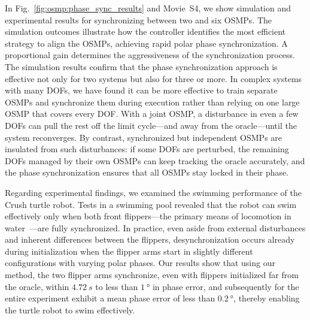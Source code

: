 In Fig.~\ref{fig:osmp:phase_sync_results} and Movie~S4, we show simulation and experimental results for synchronizing between two and six \glspl{OSMP}. The simulation outcomes illustrate how the controller identifies the most efficient strategy to align the \glspl{OSMP}, achieving rapid polar phase synchronization. A proportional gain determines the aggressiveness of the synchronization process. The simulation results confirm that the phase synchronization approach is effective not only for two systems but also for three or more.
In complex systems with many \glspl{DOF}, we have found it can be more effective to train separate \glspl{OSMP} and synchronize them during execution rather than relying on one large \gls{OSMP} that covers every DOF. With a joint \gls{OSMP}, a disturbance in even a few DOFs can pull the rest off the limit cycle—and away from the oracle—until the system reconverges. By contrast, synchronized but independent \glspl{OSMP} are insulated from such disturbances: if some \glspl{DOF} are perturbed, the remaining DOFs managed by their own \glspl{OSMP} can keep tracking the oracle accurately, and the phase synchronization ensures that all \glspl{OSMP} stay locked in their phase.

Regarding experimental findings, we examined the swimming performance of the Crush turtle robot. Tests in a swimming pool revealed that the robot can swim effectively only when both front flippers—the primary means of locomotion in water~\citep{van2022new, van2023soft}—are fully synchronized. In practice, even aside from external disturbances and inherent differences between the flippers, desynchronization occurs already during initialization when the flipper arms start in slightly different configurations with varying polar phases. Our results show that using our method, the two flipper arms synchronize, even with flippers initialized far from the oracle, within $\SI{4.72}{s}$ to less than $\SI{1}{\degree}$ in phase error, and subsequently for the entire experiment exhibit a mean phase error of less than $\SI{0.2}{\degree}$, thereby enabling the turtle robot to swim effectively.

